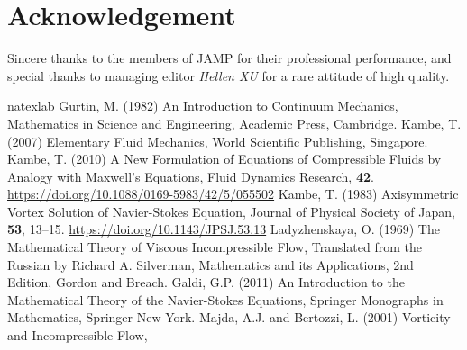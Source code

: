 \documentclass[a4 paper, 11pt,twoside]{article}
\newcommand{\0}{\Bf{0}}
\theoremstyle{definition}
\begin{document}
\section*{Acknowledgement}
Sincere thanks to the members of JAMP for their professional performance, and special thanks to managing editor {\it Hellen XU} for a rare attitude of high quality.
\def\cprime{$'$} \def\cprime{$'$}
{\color{Brown}\begin{thebibliography}{8}
{\color{black}

\expandafter\ifx\csname natexlab\endcsname\relax\def\natexlab#1{#1}\fi
\providecommand{\bibinfo}[2]{#2}
\ifx\xfnm\relax \def\xfnm[#1]{\unskip,\space#1}\fi
\bibinfo{author}{Gurtin, M.} \bibinfo{year}{(1982)} \bibinfo{title}{An Introduction to Continuum
  Mechanics}, Mathematics in Science and Engineering,
  \bibinfo{publisher}{Academic Press}, Cambridge.
\bibinfo{author}{Kambe, T.} \bibinfo{year}{(2007)} \bibinfo{title}{Elementary Fluid Mechanics},
  \bibinfo{publisher}{World Scientific Publishing},
  \bibinfo{address}{Singapore}.
\bibinfo{author}{Kambe, T.} \bibinfo{year}{(2010)}
\newblock \bibinfo{title}{A New Formulation of Equations of Compressible Fluids
  by Analogy with Maxwell's Equations},
\newblock \bibinfo{journal}{Fluid Dynamics Research}, \bibinfo{volume}{{\bf 42}}. \bibinfo{doi}{\url{https://doi.org/10.1088/0169-5983/42/5/055502}}
\bibinfo{author}{Kambe, T.} \bibinfo{year}{(1983)}
\newblock \bibinfo{title}{Axisymmetric Vortex Solution of Navier-Stokes
  Equation},
\newblock \bibinfo{journal}{Journal of Physical Society of Japan},
  \bibinfo{volume}{{\bf 53}},  \bibinfo{pages}{13--15}. \bibinfo{doi}{\url{https://doi.org/10.1143/JPSJ.53.13}}
\bibinfo{author}{Ladyzhenskaya, O.} \bibinfo{year}{(1969)} \bibinfo{title}{The Mathematical Theory of
  Viscous Incompressible Flow}, Translated from the Russian by Richard A.
  Silverman, Mathematics and its Applications, 2nd Edition,
  \bibinfo{publisher}{Gordon and Breach}.
\bibinfo{author}{Galdi, G.P.} \bibinfo{year}{(2011)} \bibinfo{title}{An Introduction to the
  Mathematical Theory of the Navier-Stokes Equations}, Springer Monographs in
  Mathematics, \bibinfo{publisher}{Springer New York}.
\bibinfo{author}{Majda, A.J.} and \bibinfo{author}{Bertozzi, L.} \bibinfo{year}{(2001)}   \bibinfo{title}{Vorticity and Incompressible Flow},
}
\end{thebibliography}}
\end{document}
